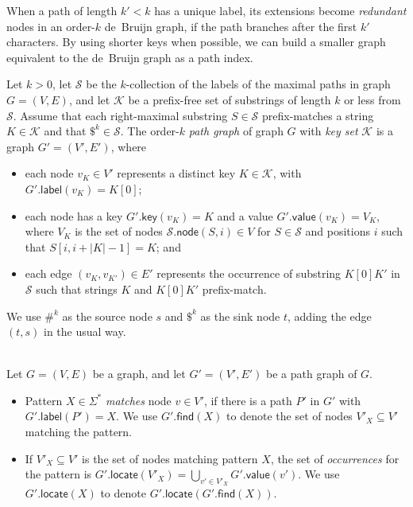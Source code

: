 \documentclass[twoside,leqno,twocolumn]{article}
\newcommand{\abs}[1]{\ensuremath{\lvert #1 \rvert}}
\newcommand{\find}{\ensuremath{\mathsf{find}}}
\newcommand{\locate}{\ensuremath{\mathsf{locate}}}
\newcommand{\glabel}{\ensuremath{\mathsf{label}}}
\newcommand{\gkey}{\ensuremath{\mathsf{key}}}
\newcommand{\gvalue}{\ensuremath{\mathsf{value}}}
\newcommand{\gnode}{\ensuremath{\mathsf{node}}}
\newcommand{\kcollection}[1]{$#1$\nobreakdash-collection}
\newcommand{\orderk}[1]{order\nobreakdash-$#1$}
\begin{document}
When a path of length $k' < k$ has a unique label, its extensions become \emph{redundant} nodes in an \orderk{k} de~Bruijn graph, if the path branches after the first $k'$ characters. By using shorter keys when possible, we can build a smaller graph equivalent to the de~Bruijn graph as a path index.

\begin{Definition}
Let $k > 0$, let $\mathcal{S}$ be the \kcollection{k} of the labels of the maximal paths in graph $G = (V, E)$, and let $\mathcal{K}$ be a prefix-free set of substrings of length $k$ or less from $\mathcal{S}$. Assume that each right-maximal substring $S \in \mathcal{S}$ prefix-matches a string $K \in \mathcal{K}$ and that $\$^{k} \in \mathcal{S}$. The \orderk{k} \emph{path graph} of graph $G$ with \emph{key set} $\mathcal{K}$ is a graph $G' = (V', E')$, where
\begin{itemize}
\item each node $v_{K} \in V'$ represents a distinct key $K \in \mathcal{K}$, with $G'.\glabel(v_{K}) = K[0]$;
\item each node has a key $G'.\gkey(v_{K}) = K$ and a value $G'.\gvalue(v_{K}) = V_{K}$, where $V_{K}$ is the set of nodes $\mathcal{S}.\gnode(S, i) \in V$ for $S \in \mathcal{S}$ and positions $i$ such that $S[i, i+\abs{K}-1] = K$; and
\item each edge $(v_{K}, v_{K'}) \in E'$ represents the occurrence of substring $K[0] K'$ in $\mathcal{S}$ such that strings $K$ and $K[0] K'$ prefix-match.
\end{itemize}
We use $\#^{k}$ as the source node $s$ and $\$^{k}$ as the sink node $t$, adding the edge $(t, s)$ in the usual way.
\end{Definition}

\begin{Definition} ~\\
Let $G = (V, E)$ be a graph, and let $G' = (V', E')$ be a path graph of $G$.
\begin{itemize}
\item Pattern $X \in \Sigma^{\ast}$ \emph{matches} node $v \in V'$, if there is a path $P'$ in $G'$ with $G'.\glabel(P') = X$. We use $G'.\find(X)$ to denote the set of nodes $V'_{X} \subseteq V'$ matching the pattern.
\item If $V'_{X} \subseteq V'$ is the set of nodes matching pattern $X$, the set of \emph{occurrences} for the pattern is $G'.\locate(V'_{X}) = \bigcup_{v' \in V'_{X}} G'.\gvalue(v')$. We use $G'.\locate(X)$ to denote $G'.\locate(G'.\find(X))$.
\end{itemize}
\end{Definition}
\end{document}
